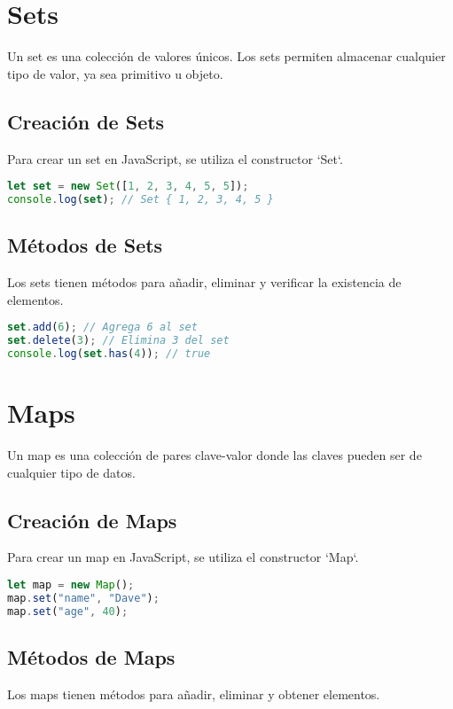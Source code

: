 \documentclass{book}
\begin{document}
\section{Sets}
Un set es una colección de valores únicos. Los sets permiten almacenar cualquier tipo de valor, ya sea primitivo u objeto.

\subsection{Creación de Sets}
Para crear un set en JavaScript, se utiliza el constructor `Set`.

\begin{lstlisting}[language=JavaScript]
let set = new Set([1, 2, 3, 4, 5, 5]);
console.log(set); // Set { 1, 2, 3, 4, 5 }
\end{lstlisting}

\subsection{Métodos de Sets}
Los sets tienen métodos para añadir, eliminar y verificar la existencia de elementos.

\begin{lstlisting}[language=JavaScript]
set.add(6); // Agrega 6 al set
set.delete(3); // Elimina 3 del set
console.log(set.has(4)); // true
\end{lstlisting}

\section{Maps}
Un map es una colección de pares clave-valor donde las claves pueden ser de cualquier tipo de datos.

\subsection{Creación de Maps}
Para crear un map en JavaScript, se utiliza el constructor `Map`.

\begin{lstlisting}[language=JavaScript]
let map = new Map();
map.set("name", "Dave");
map.set("age", 40);
\end{lstlisting}

\subsection{Métodos de Maps}
Los maps tienen métodos para añadir, eliminar y obtener elementos.
\end{document}
